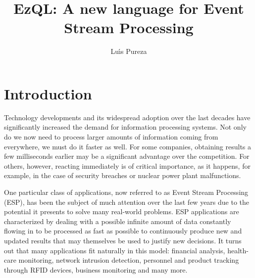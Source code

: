 \documentclass[a4,11pt]{report}
\begin{document}
\title{EzQL: A new language for Event Stream Processing}
\author{Lu\'{\i}s Pureza}

\maketitle

\tableofcontents

\addtolength{\parskip}{\baselineskip}
\chapter{Introduction}
\label{chap:introduction}

Technology developments and its widespread adoption over the last
decades have significantly increased the demand for information
processing systems. Not only do we now need to process larger amounts
of information coming from everywhere, we must do it faster as
well. For some companies, obtaining results a few milliseconds earlier
may be a significant advantage over the competition. For others,
however, reacting immediately is of critical importance, as it
happens, for example, in the case of security breaches or nuclear
power plant malfunctions.

One particular class of applications, now referred to as Event Stream
Processing (ESP), has been the subject of much attention over the last
few years due to the potential it presents to solve many real-world
problems. ESP applications are characterized by dealing with a
possible infinite amount of data constantly flowing in to be processed
as fast as possible to continuously produce new and updated results
that may themselves be used to justify new decisions. It turns out
that many applications fit naturally in this model: financial
analysis, health-care monitoring, network intrusion detection,
personnel and product tracking through RFID devices, business
monitoring and many more.
\end{document}
